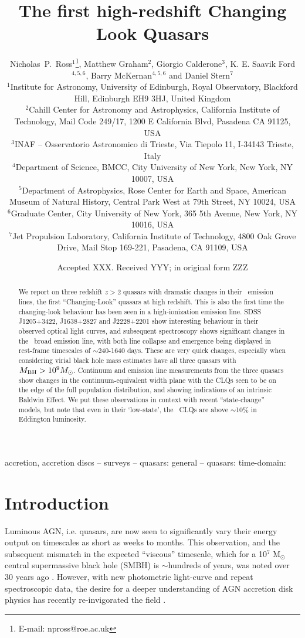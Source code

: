 \documentclass[fleqn,usenatbib]{mnras}
\title[High-redshift CLQs]{The first high-redshift Changing Look Quasars}
\author[Ross {\it et al.}]
{Nicholas~P.~Ross$^{1}$\thanks{E-mail: npross@roe.ac.uk},
Matthew Graham$^{2}$,
Giorgio Calderone$^{3}$, 
K. E. Saavik Ford$^{4,5,6}$,  
\newauthor Barry McKernan$^{4,5,6}$  and Daniel Stern$^{7}$  
\\
$^{1}$Institute for Astronomy, University of Edinburgh, Royal Observatory, Blackford Hill, Edinburgh EH9 3HJ, United Kingdom \\
$^{2}$Cahill Center for Astronomy and Astrophysics, California Institute of Technology, Mail Code 249/17, 1200 E California Blvd, Pasadena CA 91125, USA\\
$^{3}$INAF -- Osservatorio Astronomico di Trieste, Via Tiepolo 11, I-34143 Trieste, Italy \\
$^{4}$Department of Science, BMCC, City University of New York, New York, NY 10007, USA \\
$^{5}$Department of Astrophysics, Rose Center for Earth and Space, American Museum of Natural History, Central Park West at 79th Street, NY 10024, USA \\
$^{6}$Graduate Center, City University of New York, 365 5th Avenue, New York, NY 10016, USA\\
$^{7}$Jet Propulsion Laboratory, California Institute of Technology, 4800 Oak Grove Drive, Mail Stop 169-221, Pasadena, CA 91109, USA \\
}
\date{Accepted XXX. Received YYY; in original form ZZZ}
\begin{document}
\label{firstpage}
\pagerange{\pageref{firstpage}--\pageref{lastpage}}
\maketitle

\begin{abstract}
We report on three redshift $z>2$ quasars with dramatic changes in
their \civ\ emission lines, the first ``Changing-Look'' quasars at
high redshift.  This is also the first time the changing-look
behaviour has been seen in a high-ionization emission line.  SDSS
J1205+3422, J1638+2827 and J2228+2201 show interesting behaviour in
their observed optical light curves, and subsequent spectroscopy shows
significant changes in the \civ\ broad emission line, with both line
collapse and emergence being displayed in rest-frame timescales of
$\sim$240-1640 days.  These are very quick changes, especially when
considering virial black hole mass estimates have all three quasars
with $M_{\rm BH} > 10^{9} M_{\odot}$.  Continuum and emission line
measurements from the three quasars show changes in the
continuum-equivalent width plane with the CLQs seen to be on the edge
of the full population distribution, and showing indications of an
intrinsic Baldwin Effect. We put these observations in context with
recent ``state-change'' models, but note that even in their
`low-state', the \civ\ CLQs are above $\sim$10\% in Eddington
luminosity.
\end{abstract}

\begin{keywords}
accretion, accretion discs -- surveys -- quasars: general -- quasars: time-domain: 
\end{keywords}


\section{Introduction}
Luminous AGN, i.e. quasars, are now seen to significantly vary their
energy output on timescales as short as weeks to months.  This
observation, and the subsequent mismatch in the expected ``viscous''
timescale, which for a 10$^{7}$ M$_{\odot}$ central supermassive black
hole (SMBH) is $\sim$hundreds of years, was noted over 30 years ago
\citep[e.g.][]{Alloin1985}. However, with new photometric light-curve
and repeat spectroscopic data, the desire for a deeper understanding
of AGN accretion disk physics has recently re-invigorated the field
\citep[e.g.][]{Antonucci2018, Lawrence2018, Ross2018, Stern2018}.
\end{document}

